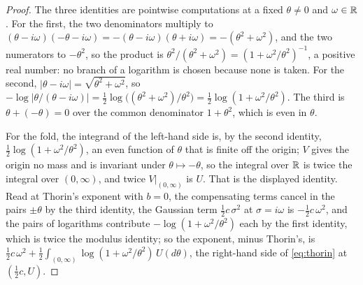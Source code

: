 \begin{proof}\leanok
The three identities are pointwise computations at a fixed $\theta \ne 0$ and $\omega \in \mathbb{R}$.
For the first, the two denominators multiply to $(\theta - i\omega)(-\theta - i\omega)
= -(\theta - i\omega)(\theta + i\omega) = -(\theta^2 + \omega^2)$, and the two numerators to
$-\theta^2$, so the product is $\theta^2/(\theta^2 + \omega^2) = (1 + \omega^2/\theta^2)^{-1}$,
a positive real number: no branch of a logarithm is chosen because none is taken. For the
second, $|\theta - i\omega| = \sqrt{\theta^2 + \omega^2}$, so
$-\log|\theta/(\theta - i\omega)| = \tfrac12\log\bigl((\theta^2+\omega^2)/\theta^2\bigr)
= \tfrac12\log(1 + \omega^2/\theta^2)$. The third is $\theta + (-\theta) = 0$ over the common
denominator $1 + \theta^2$, which is even in $\theta$.

For the fold, the integrand of the left-hand side is, by the second identity,
$\tfrac12\log(1 + \omega^2/\theta^2)$, an even function of $\theta$ that is finite off the
origin; $V$ gives the origin no mass and is invariant under $\theta \mapsto -\theta$, so the
integral over $\mathbb{R}$ is twice the integral over $(0,\infty)$, and twice $V|_{(0,\infty)}$ is $U$.
That is the displayed identity. Read at Thorin's exponent with $b = 0$, the compensating terms
cancel in the pairs $\pm\theta$ by the third identity, the Gaussian term $\tfrac12 c\,\sigma^2$
at $\sigma = i\omega$ is $-\tfrac12 c\,\omega^2$, and the pairs of logarithms contribute
$-\log(1 + \omega^2/\theta^2)$ each by the first identity, which is twice the modulus identity;
so the \Levy{} exponent, minus Thorin's, is $\tfrac12 c\,\omega^2 + \tfrac12\int_{(0,\infty)}
\log(1 + \omega^2/\theta^2)\,U(d\theta)$, the right-hand side of \ref{eq:thorin} at
$(\tfrac12 c, U)$.
\end{proof}

